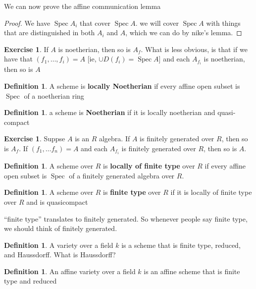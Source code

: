 \documentclass{book}
\newcommand{\spec}{\operatorname{Spec}}
\theoremstyle{definition}
\newtheorem{definition}[theorem]{Definition}
\newtheorem{exercise}[theorem]{Exercise}
\begin{document}
We can now prove the affine communication lemma
\begin{proof}
We have $\spec A_i$ that cover $\spec A$. we will cover $\spec A$ with things
that are distinguished in both $A_i$ and $A$, which we can do by nike's lemma.
\end{proof}

\begin{exercise}
If $A$ is noetherian, then so is $A_f$. What is less obvious, is that if we 
have that $(f_1, \dots, f_i) = A$ [ie, $\cup D(f_i) = \spec A$] and each $A_{f_i}$
is noetherian, then so is $A$
\end{exercise}

\begin{definition}
A scheme is \textbf{locally Noetherian }if every affine open subset is $\spec$
of a noetherian ring
\end{definition}

\begin{definition}
a scheme is \textbf{Noetherian} if it is locally noetherian and quasi-compact
\end{definition}

\begin{exercise}
Suppse $A$ is an $R$ algebra. If $A$ is finitely generated over $R$, then
so is $A_f$. If $(f_1, \dots f_n) = A$ and each $A_{f_i}$ is finitely 
generated over $R$, then so is $A$.
\end{exercise}

\begin{definition}
A scheme over $R$ is \textbf{locally of finite type} over $R$ if every affine open subset
is $\spec$ of a finitely generated algebra over $R$. 
\end{definition}

\begin{definition}
A scheme over $R$ is \textbf{finite type} over $R$ if it is  locally of finite
type over $R$ and is quasicompact
\end{definition}

``finite type'' translates to finitely generated. So whenever people say finite
type, we should think of finitely generated.

\begin{definition}
A variety over a field $k$ is a scheme that is finite type, reduced, and Haussdorff.
What is Haussdorff?
\end{definition}

\begin{definition}
An affine variety over a field $k$ is an affine scheme that is finite type
and reduced
\end{definition}
\end{document}
